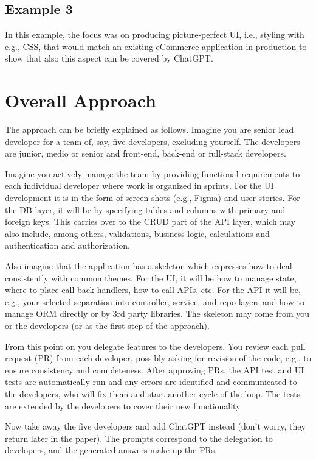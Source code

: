 \documentclass[runningheads]{llncs}
\begin{document}
\subsection{Example 3}
In this example, the focus was on producing picture-perfect UI, i.e., styling with e.g., CSS, that would match an existing eCommerce application in production to show that also this aspect can be covered by ChatGPT.

\section{Overall Approach}
The approach can be briefly explained as follows. Imagine you are senior lead developer for a team of, say, five developers, excluding yourself. The developers are junior, medio or senior and front-end, back-end or full-stack developers.

Imagine you actively manage the team by providing functional requirements to each individual developer where work is organized in sprints. For the UI development it is in the form of screen shots (e.g., Figma) and user stories. For the DB layer, it will be by specifying tables and columns with primary and foreign keys. This carries over to the CRUD part of the API layer, which may also include, among others, validations, business logic, calculations and authentication and authorization.

Also imagine that the application has a skeleton which expresses how to deal consistently with common themes. For the UI, it will be how to manage state, where to place call-back handlers, how to call APIs, etc. For the API it will be, e.g., your selected separation into controller, service, and repo layers and how to manage ORM directly or by 3rd party libraries. The skeleton may come from you or the developers (or as the first step of the approach).

From this point on you delegate features to the developers. You review each pull request (PR) from each developer, possibly asking for revision of the code, e.g., to ensure consistency and completeness. After approving PRs, the API test and UI tests are automatically run and any errors are identified and communicated to the developers, who will fix them and start another cycle of the loop. The tests are extended by the developers to cover their new functionality.

Now take away the five developers and add ChatGPT instead (don't worry, they return later in the paper). The prompts correspond to the delegation to developers, and the generated answers make up the PRs.
\end{document}
